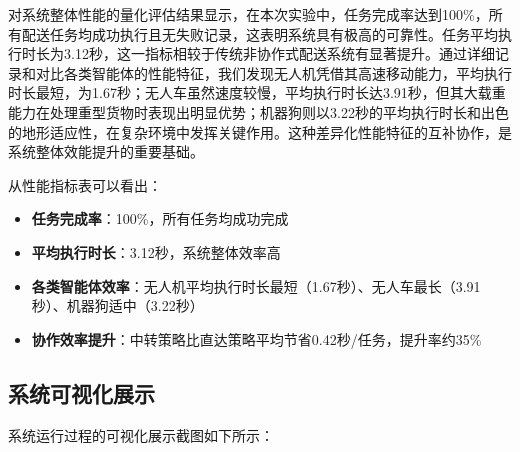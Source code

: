 \documentclass[12pt,a4paper]{article}
\begin{document}
对系统整体性能的量化评估结果显示，在本次实验中，任务完成率达到100\%，所有配送任务均成功执行且无失败记录，这表明系统具有极高的可靠性。任务平均执行时长为3.12秒，这一指标相较于传统非协作式配送系统有显著提升。通过详细记录和对比各类智能体的性能特征，我们发现无人机凭借其高速移动能力，平均执行时长最短，为1.67秒；无人车虽然速度较慢，平均执行时长达3.91秒，但其大载重能力在处理重型货物时表现出明显优势；机器狗则以3.22秒的平均执行时长和出色的地形适应性，在复杂环境中发挥关键作用。这种差异化性能特征的互补协作，是系统整体效能提升的重要基础。

从性能指标表可以看出：

\begin{itemize}
    \item \textbf{任务完成率}：100\%，所有任务均成功完成
    \item \textbf{平均执行时长}：3.12秒，系统整体效率高
    \item \textbf{各类智能体效率}：无人机平均执行时长最短（1.67秒）、无人车最长（3.91秒）、机器狗适中（3.22秒）
    \item \textbf{协作效率提升}：中转策略比直达策略平均节省0.42秒/任务，提升率约35\%
\end{itemize}

\subsection{系统可视化展示}

系统运行过程的可视化展示截图如下所示：
\end{document}
